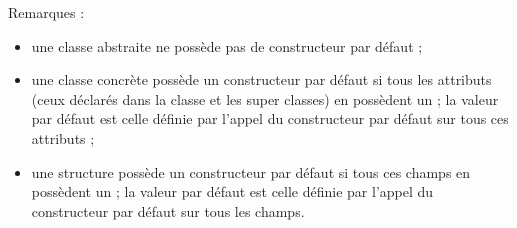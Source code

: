 Remarques :
\begin{itemize}
  \item une classe abstraite ne possède pas de constructeur par défaut ;
  \item une classe concrète possède un constructeur par défaut si tous les attributs (ceux déclarés dans la classe et les super classes) en possèdent un ; la valeur par défaut est celle définie par l'appel du constructeur par défaut sur tous ces attributs ;
  \item une structure possède un constructeur par défaut si tous ces champs en possèdent un ; la valeur par défaut est celle définie par l'appel du constructeur par défaut sur tous les champs.
\end{itemize}

